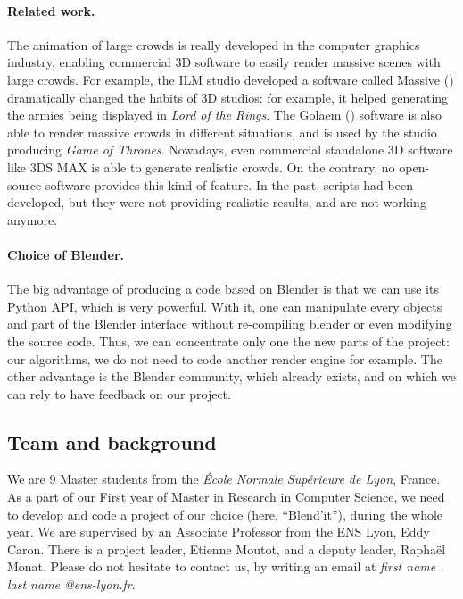 \documentclass[a4paper,11pt]{article}
\newcommand\mr{Raphaël Monat} %
\newcommand\me{Etienne Moutot} %
\begin{document}
\paragraph{Related work.} The animation of large crowds is really developed in the computer graphics industry, enabling commercial 3D software to easily render massive scenes with large crowds. For example, the ILM studio developed a software called Massive (\cite{Massive}) dramatically changed the habits of 3D studios: for example, it helped generating the armies being displayed in \textit{Lord of the Rings}. The Golaem (\cite{Golaem}) software is also able to render massive crowds in different situations, and is used by the studio producing \textit{Game of Thrones}. Nowadays, even commercial standalone 3D software like 3DS MAX\cite{3dsmax} is able to generate realistic crowds. On the contrary, no open-source software provides this kind of feature. In the past, scripts had been developed, but they were not providing realistic results, and are not working anymore.

\paragraph{Choice of Blender.}

The big advantage of producing a code based on Blender is that we can use its Python API, which is very powerful. With it, one can manipulate every objects and part of the Blender interface without re-compiling blender or even modifying the source code. Thus, we can concentrate only one the new parts of the project: our algorithms, we do not need to code another render engine for example.
The other advantage is the Blender community, which already exists, and on which we can rely to have feedback on our project.



\subsection{Team and background}

We are 9 Master students from the \textit{École Normale Supérieure de Lyon}, France. As a part of our First year of Master in Research in Computer Science, we need to develop and code a project of our choice (here, ``Blend'it''), during the whole year. We are supervised by an Associate Professor from the ENS Lyon, Eddy Caron. There is a project leader, \me, and a deputy leader, \mr. Please do not hesitate to contact us, by writing an email at \textit{first name . last name @ens-lyon.fr}.\\
\end{document}
